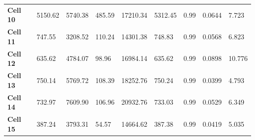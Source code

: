 \documentclass{article}
\begin{document}
\begin{table}[h!]
\begin{tabular}{|p{1.2cm}|p{1.5cm}|p{1.5cm}|p{1.5cm}|p{1.7cm}|p{1.5cm}|p{1.7cm}|p{1.5cm}|p{1.7cm}|}
\textbf{Cell 10} & 5150.62 & 5740.38 & 485.59 & 17210.34 & 5312.45 & 0.99 & 0.0644 & 7.723 \\
\textbf{Cell 11} & 747.55 & 3208.52 & 110.24 & 14301.38 & 748.83 & 0.99 & 0.0568 & 6.823 \\
\textbf{Cell 12} & 635.62 & 4784.07 & 98.96 & 16984.14 & 635.62 & 0.99 & 0.0898 & 10.776 \\
\textbf{Cell 13} & 750.14 & 5769.72 & 108.39 & 18252.76 & 750.24 & 0.99 & 0.0399 & 4.793 \\
\textbf{Cell 14} & 732.97 & 7609.90 & 106.96 & 20932.76 & 733.03 & 0.99 & 0.0529 & 6.349 \\
\textbf{Cell 15} & 387.24 & 3793.31 & 54.57 & 14664.62 & 387.38 & 0.99 & 0.0419 & 5.035 \\
\hline
\end{tabular}
\end{table}
\end{document}
